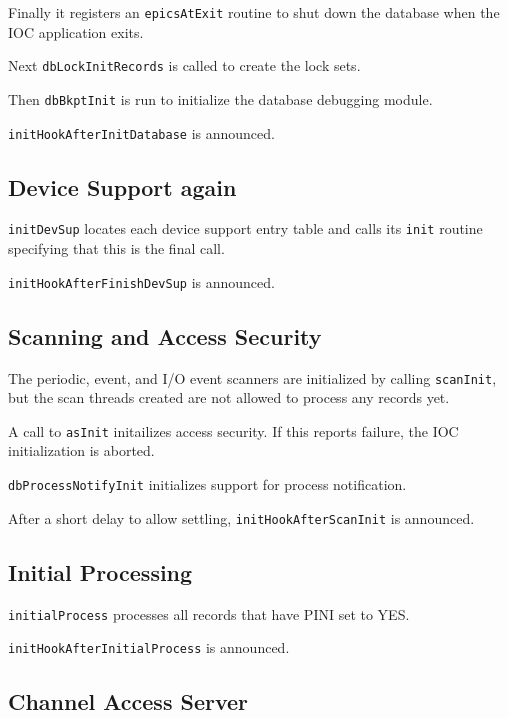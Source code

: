 Finally it registers an \verb|epicsAtExit| routine to shut down the database when the IOC application exits.

Next \verb|dbLockInitRecords| is called to create the lock sets.

Then \verb|dbBkptInit| is run to initialize the database debugging module.

\verb|initHookAfterInitDatabase| is announced.

\subsection{Device Support again}

\verb|initDevSup| locates each device support entry table and calls its \verb|init| routine specifying that this is the final call.

\verb|initHookAfterFinishDevSup| is announced.

\subsection{Scanning and Access Security}

The periodic, event, and I/O event scanners are initialized by calling \verb|scanInit|, but the scan threads created are not allowed to process any records yet.

A call to \verb|asInit| initailizes access security.
If this reports failure, the IOC initialization is aborted.

\verb|dbProcessNotifyInit| initializes support for process notification.

After a short delay to allow settling, \verb|initHookAfterScanInit| is announced.

\subsection{Initial Processing}

\verb|initialProcess| processes all records that have PINI set to YES.

\verb|initHookAfterInitialProcess| is announced.

\subsection{Channel Access Server}


